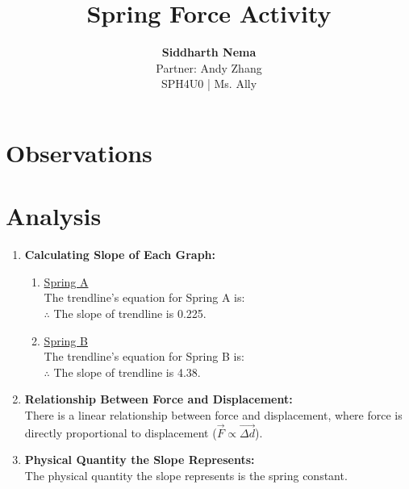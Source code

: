 \documentclass[12pt,letterpaper]{article}
\title{\textbf{Spring Force Activity}}
\author{\textbf{Siddharth Nema} \\Partner: Andy Zhang \\SPH4U0 | Ms.\hspace{-1mm} Ally}
\begin{document}
\maketitle
\newpage
\section{Observations}

\vspace{-8mm}
\section{Analysis}
\vspace{-4mm}



\newpage

\begin{enumerate}[font=\bfseries]
	\item \textbf{Calculating Slope of Each Graph:}
	      \vspace{-4mm}
	      \begin{enumerate}
		      \item \underline{Spring A}\\
		            The trendline's equation for Spring A is:~\\
		            $\therefore$ The slope of trendline is 0.225.
		      \item \underline{Spring B}\\
		            The trendline's equation for Spring B is:~\\
		            $\therefore$ The slope of trendline is 4.38.
	      \end{enumerate}
	\item \textbf{Relationship Between Force and Displacement:}\\
	      There is a linear relationship between force and displacement, where force is directly proportional to displacement ($\vec{F} \propto \vec{\Delta d}$).
	\item \textbf{Physical Quantity the Slope Represents:}\\
	      The physical quantity the slope represents is the spring constant.
\end{enumerate}
\end{document}
